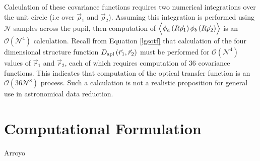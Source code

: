 Calculation of these covariance functions requires two numerical
integrations over the unit circle (i.e over $\vec{\rho}_{1}$
and $\vec{\rho}_{2}$).  Assuming this integration is performed
using $\mathcal{N}$ samples across the pupil, then computation of
$\left\langle \vphantom{\hat{\phi}_{a}}
\phi_{a}\left(R\vec{\rho}_{1}\right)
\phi_{b}\left(R\vec{\rho}_{2}\right)\right\rangle$ is an
$\mathcal{O}(\mathcal{N}^{4})$ calculation.  Recall from Equation
\ref{lgsotf} that calculation of the four dimensional structure
function $D_{\rm apl}\left(\vec{r}_{1},
\vec{r}_{2}\right)$ must be performed for
$\mathcal{O}(\mathcal{N}^{4})$ values of $\vec{r}_{1}$ and
$\vec{r}_{2}$, each of which requires computation of 36
covariance functions.  This indicates that computation of the optical
transfer function is an $\mathcal{O}(36\mathcal{N}^{8})$ process.
Such a calculation is not a realistic proposition for general use in
astronomical data reduction.

\section{Computational Formulation}
\label{sec:compcovariance}


Arroyo \cite{}

